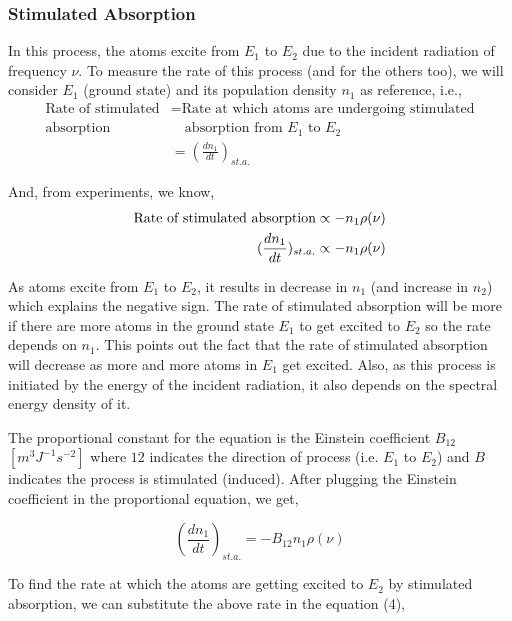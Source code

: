 \documentclass[12pt]{article}
\begin{document}
\subsubsection{Stimulated Absorption}

In this process, the atoms excite from $E_{1}$ to $E_{2}$ due to the incident radiation of frequency $\nu$. To measure the rate of this process (and for the others too), we will consider $E_{1}$ (ground state) and its population density $n_{1}$ as reference, i.e.,
\begin{align*}
    \text{Rate of stimulated} & = \text{Rate at which atoms are undergoing stimulated} \\
    \text{absorption} & \quad \text{absorption from } E_{1} \text{ to } E_{2} \\ 
    & = (\frac{dn_{1}}{dt})_{st.a.}
\end{align*}

And, from experiments, we know, 
\begin{align*}
    \textnormal{Rate of stimulated absorption} \propto -n_{1}\rho(\nu) \\ 
    (\frac{dn_{1}}{dt})_{st.a.} \propto -n_{1}\rho(\nu)
\end{align*}

As atoms excite from $E_{1}$ to $E_{2}$, it results in decrease in $n_{1}$ (and increase in $n_{2}$) which explains the negative sign. The rate of stimulated absorption will be more if there are more atoms in the ground state $E_{1}$ to get excited to $E_{2}$ so the rate depends on $n_{1}$. This points out the fact that the rate of stimulated absorption will decrease as more and more atoms in $E_{1}$ get excited. Also, as this process is initiated by the energy of the incident radiation, it also depends on the spectral energy density of it. \vspace{.2cm}

The proportional constant for the equation is the Einstein coefficient $B_{12}$ $[m^{3}J^{-1}s^{-2}]$ where $12$ indicates the direction of process (i.e. $E_{1}$ to $E_{2}$) and $B$ indicates the process is stimulated (induced). After plugging the Einstein coefficient in the proportional equation, we get,

\begin{equation}
    (\frac{dn_{1}}{dt})_{st.a.} = -B_{12}n_{1}\rho(\nu) 
\end{equation}

To find the rate at which the atoms are getting excited to $E_{2}$ by stimulated absorption, we can substitute the above rate in the equation (4),
\end{document}
